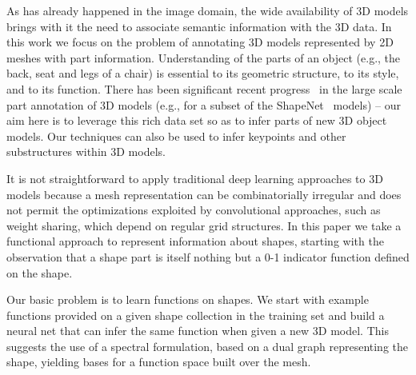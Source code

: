 \label{sec:intro}
As has already happened in the image domain, the wide availability of 3D models brings with it the need to associate semantic information with the 3D data. In this work we focus on the problem of annotating 3D models represented by 2D meshes with part information. Understanding of the parts of an object (e.g., the back, seat and legs of a chair) is essential to its geometric structure, to its style, and to its function. %
There has been significant recent progress~\cite{Yi16} in the large scale part annotation of 3D models (e.g., for a subset of the ShapeNet~\cite{shapenet2015} models) -- our aim here is to leverage this rich data set so as to infer parts of new 3D object models. Our techniques can also be used to infer keypoints and other substructures within 3D models.

It is not straightforward to apply traditional deep learning approaches to 3D models because a mesh representation can be combinatorially irregular and does not permit the optimizations exploited by convolutional approaches, such as weight sharing, which depend on regular grid structures. In this paper we take a functional approach to represent information about shapes, starting with the observation that a shape part is itself nothing but a 0-1 indicator function defined on the shape. 

Our basic problem is to learn functions on shapes. We start with example functions provided on a given shape collection in the training set and build a neural net that can infer the same function when given a new 3D model. This suggests the use of a spectral formulation, based on a dual graph representing the shape, yielding bases for a function space built over the mesh.  %

